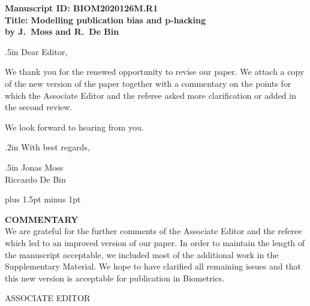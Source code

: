 \documentclass[11pt]{article}
\begin{document}
{\bf
\noindent Manuscript ID: BIOM2020126M.R1  \\
Title: Modelling publication bias and p-hacking \\
by J.\ Moss and R.\ De Bin}


\vglue .5in \noindent Dear Editor,


\vspace{0.5cm}

\noindent We thank you for the renewed opportunity to revise our paper. We attach a copy of the new  version of the paper together with a commentary on the points for which the Associate Editor and the referee asked more clarification or added in the second review.


\vspace{0.3cm}

\noindent We look forward to hearing from you.%

\vglue .2in \noindent With best regards,

\vglue .5in
\noindent 
Jonas Moss\\
Riccardo De Bin \\

\pagestyle{empty}
\newpage



\parindent=0pt
\parskip=4pt plus 1.5pt minus 1pt


{\bf COMMENTARY} \\

We are grateful for the further comments of the Associate Editor and the referee which led to an improved version of our paper. In order to maintain the length of the manuscript acceptable, we included most of the additional work in the Supplementary Material. We hope to have clarified all remaining issues and that this new version is acceptable for publication in Biometrics.

\vspace{2cm}

\begin{center}
ASSOCIATE EDITOR
\end{center}
\end{document}
